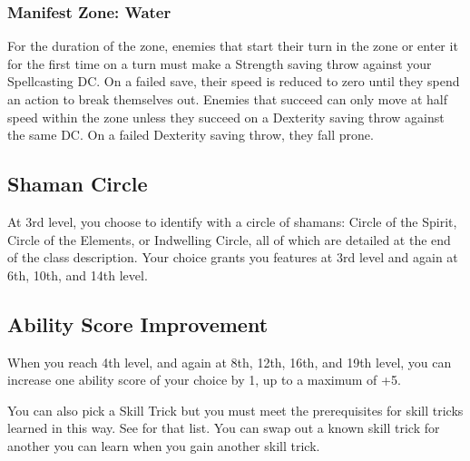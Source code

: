 \subsubsection{Manifest Zone: Water}
For the duration of the zone, enemies that start their turn in the zone or enter it for the first time on a turn must make a Strength saving throw against your Spellcasting DC. On a failed save, their speed is reduced to zero until they spend an action to break themselves out. Enemies that succeed can only move at half speed within the zone unless they succeed on a Dexterity saving throw against the same DC. On a failed Dexterity saving throw, they fall prone.

\subsection{Shaman Circle}

At 3rd level, you choose to identify with a circle of shamans: Circle of the Spirit, Circle of the Elements, or Indwelling Circle, all of which are detailed at the end of the class description. Your choice grants you features at 3rd level and again at 6th, 10th, and 14th level.

\subsection{Ability Score Improvement}

When you reach 4th level, and again at 8th, 12th, 16th, and 19th level, you can increase one ability score of your choice by 1, up to a maximum of +5.

You can also pick a Skill Trick but you must meet the prerequisites for skill tricks learned in this way. See  for that list. You can swap out a known skill trick for another you can learn when you gain another skill trick.

